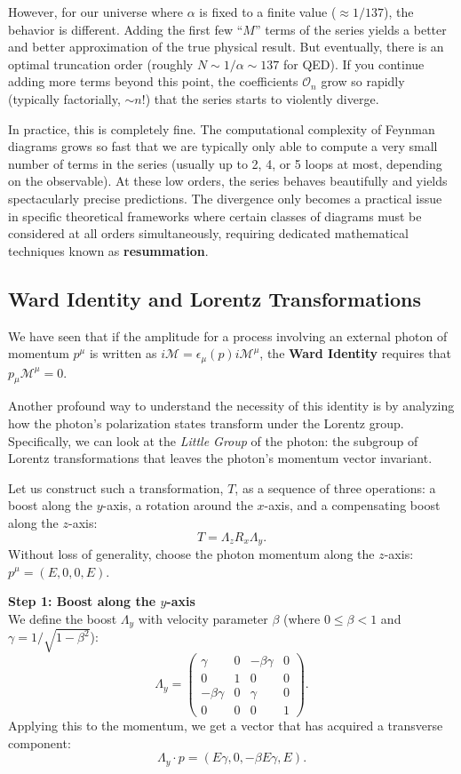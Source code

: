 However, for our universe where \(\alpha\) is fixed to a finite value (\(\approx 1/137\)), the behavior is different. Adding the first few ``\(M\)'' terms of the series yields a better and better approximation of the true physical result. But eventually, there is an optimal truncation order (roughly \(N \sim 1/\alpha \sim 137\) for QED). If you continue adding more terms beyond this point, the coefficients \(\mathcal{O}_n\) grow so rapidly (typically factorially, \(\sim n!\)) that the series starts to violently diverge.

In practice, this is completely fine. The computational complexity of Feynman diagrams grows so fast that we are typically only able to compute a very small number of terms in the series (usually up to 2, 4, or 5 loops at most, depending on the observable). At these low orders, the series behaves beautifully and yields spectacularly precise predictions. The divergence only becomes a practical issue in specific theoretical frameworks where certain classes of diagrams must be considered at all orders simultaneously, requiring dedicated mathematical techniques known as \textbf{resummation}.

\subsection{Ward Identity and Lorentz Transformations}

We have seen that if the amplitude for a process involving an external photon of momentum $p^\mu$ is written as $i\mathcal{M} = \epsilon_\mu(p) i\mathcal{M}^\mu$, the \textbf{Ward Identity} requires that $p_\mu \mathcal{M}^\mu = 0$.

Another profound way to understand the necessity of this identity is by analyzing how the photon's polarization states transform under the Lorentz group. Specifically, we can look at the \textit{Little Group} of the photon: the subgroup of Lorentz transformations that leaves the photon's momentum vector invariant.

Let us construct such a transformation, $T$, as a sequence of three operations: a boost along the $y$-axis, a rotation around the $x$-axis, and a compensating boost along the $z$-axis:
\[
    T = \Lambda_z R_x \Lambda_y.
\]
Without loss of generality, choose the photon momentum along the $z$-axis: $p^\mu = (E, 0, 0, E)$.

\textbf{Step 1: Boost along the $y$-axis} \\
We define the boost $\Lambda_y$ with velocity parameter $\beta$ (where $0 \leq \beta < 1$ and $\gamma = 1/\sqrt{1-\beta^2}$):
\[
    \Lambda_y = \begin{pmatrix}
        \gamma       & 0 & -\beta\gamma & 0 \\
        0            & 1 & 0            & 0 \\
        -\beta\gamma & 0 & \gamma       & 0 \\
        0            & 0 & 0            & 1
    \end{pmatrix}.
\]
Applying this to the momentum, we get a vector that has acquired a transverse component:
\[
    \Lambda_y \cdot p = (E\gamma, 0, -\beta E\gamma, E).
\]

